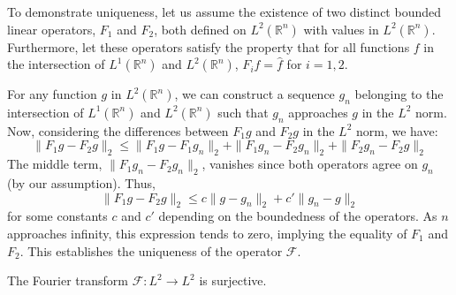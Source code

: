 To demonstrate uniqueness, let us assume the existence of two distinct bounded linear operators, $F_1$ and $F_2$, both defined on $L^2(\mathbb{R}^n)$ with values in $L^2(\mathbb{R}^n)$. Furthermore, let these operators satisfy the property that for all functions $f$ in the intersection of $L^1(\mathbb{R}^n)$ and $L^2(\mathbb{R}^n)$, $F_i f = \hat{f}$ for $i = 1,2$.

For any function $g$ in $L^2(\mathbb{R}^n)$, we can construct a sequence ${g_n}$ belonging to the intersection of $L^1(\mathbb{R}^n)$ and $L^2(\mathbb{R}^n)$ such that $g_n$ approaches $g$ in the $L^2$ norm. Now, considering the differences between $F_1 g$ and $F_2 g$ in the $L^2$ norm, we have:
$$\|F_1 g - F_2 g\|_2 \leqslant \|F_1 g - F_1 g_n\|_2 + \|F_1 g_n - F_2 g_n\|_2 + \|F_2 g_n - F_2 g\|_2$$
The middle term, $\|F_1 g_n - F_2 g_n\|_2$, vanishes since both operators agree on $g_n$ (by our assumption). Thus,
$$\|F_1 g - F_2 g\|_2 \leqslant c\|g - g_n\|_2 + c'\|g_n - g\|_2$$
for some constants $c$ and $c'$ depending on the boundedness of the operators. As $n$ approaches infinity, this expression tends to zero, implying the equality of $F_1$ and $F_2$. This establishes the uniqueness of the operator $\mathcal{F}$.
\begin{proposition}
    The Fourier transform $\mathcal{F}: L^2 \rightarrow L^2$ is surjective.
\end{proposition}
